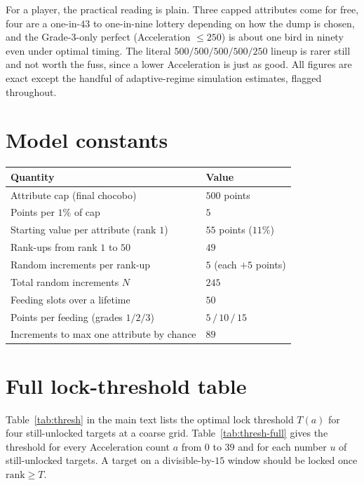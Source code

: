 \documentclass[11pt]{article}
\theoremstyle{remark}
\begin{document}
For a player, the practical reading is plain. Three capped attributes come for free,
four are a one-in-$43$ to one-in-nine lottery depending on how the dump is chosen, and
the Grade-3-only perfect (Acceleration $\le 250$) is about one bird in ninety even
under optimal timing. The literal $500/500/500/500/250$ lineup is rarer still and
not worth the fuss, since a lower Acceleration is just as good. All figures are exact
except the handful of adaptive-regime simulation estimates, flagged throughout.

\appendix
\section{Model constants}\label{app:constants}
\begin{center}
\begin{tabular}{@{}ll@{}}
\toprule
Quantity & Value \\
\midrule
Attribute cap (final chocobo) & $500$ points \\
Points per $1\%$ of cap & $5$ \\
Starting value per attribute (rank $1$) & $55$ points ($11\%$) \\
Rank-ups from rank $1$ to $50$ & $49$ \\
Random increments per rank-up & $5$ (each $+5$ points) \\
Total random increments $N$ & $245$ \\
Feeding slots over a lifetime & $50$ \\
Points per feeding (grades $1/2/3$) & $5\,/\,10\,/\,15$ \\
Increments to max one attribute by chance & $89$ \\
\bottomrule
\end{tabular}
\end{center}

\section{Full lock-threshold table}\label{app:thresh}
Table~\ref{tab:thresh} in the main text lists the optimal lock threshold $T(a)$ for
four still-unlocked targets at a coarse grid. Table~\ref{tab:thresh-full} gives the
threshold for every Acceleration count $a$ from $0$ to $39$ and for each number $u$ of
still-unlocked targets. A target on a divisible-by-$15$ window should be locked once
$\text{rank}\ge T$.
\end{document}
